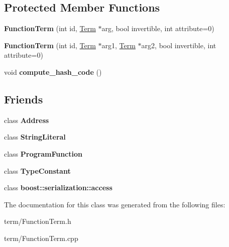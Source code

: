 \subsection*{\-Protected \-Member \-Functions}
\begin{DoxyCompactItemize}
\item 
\hypertarget{classFunctionTerm_a7f1d077f0b9ce911ad615d7bd5ba3cac}{{\bfseries \-Function\-Term} (int id, \hyperlink{classTerm}{\-Term} $\ast$arg, bool invertible, int attribute=0)}\label{classFunctionTerm_a7f1d077f0b9ce911ad615d7bd5ba3cac}

\item 
\hypertarget{classFunctionTerm_a6170213bd26f3b728776c1f7fe87b3d7}{{\bfseries \-Function\-Term} (int id, \hyperlink{classTerm}{\-Term} $\ast$arg1, \hyperlink{classTerm}{\-Term} $\ast$arg2, bool invertible, int attribute=0)}\label{classFunctionTerm_a6170213bd26f3b728776c1f7fe87b3d7}

\item 
\hypertarget{classFunctionTerm_aeef76615552e8a539b1892e94ed1991b}{void {\bfseries compute\-\_\-hash\-\_\-code} ()}\label{classFunctionTerm_aeef76615552e8a539b1892e94ed1991b}

\end{DoxyCompactItemize}
\subsection*{\-Friends}
\begin{DoxyCompactItemize}
\item 
\hypertarget{classFunctionTerm_adebe709d4e5fe83b3c51c5605f625287}{class {\bfseries \-Address}}\label{classFunctionTerm_adebe709d4e5fe83b3c51c5605f625287}

\item 
\hypertarget{classFunctionTerm_aa1502d55736d0d860b8c757993f344f4}{class {\bfseries \-String\-Literal}}\label{classFunctionTerm_aa1502d55736d0d860b8c757993f344f4}

\item 
\hypertarget{classFunctionTerm_a758f8e4b1f004f64affee9def22769ff}{class {\bfseries \-Program\-Function}}\label{classFunctionTerm_a758f8e4b1f004f64affee9def22769ff}

\item 
\hypertarget{classFunctionTerm_aeafbb0e82d7e2b2377f7dc4a4df76254}{class {\bfseries \-Type\-Constant}}\label{classFunctionTerm_aeafbb0e82d7e2b2377f7dc4a4df76254}

\item 
\hypertarget{classFunctionTerm_ac98d07dd8f7b70e16ccb9a01abf56b9c}{class {\bfseries boost\-::serialization\-::access}}\label{classFunctionTerm_ac98d07dd8f7b70e16ccb9a01abf56b9c}

\end{DoxyCompactItemize}


\-The documentation for this class was generated from the following files\-:\begin{DoxyCompactItemize}
\item 
term/\-Function\-Term.\-h\item 
term/\-Function\-Term.\-cpp\end{DoxyCompactItemize}
